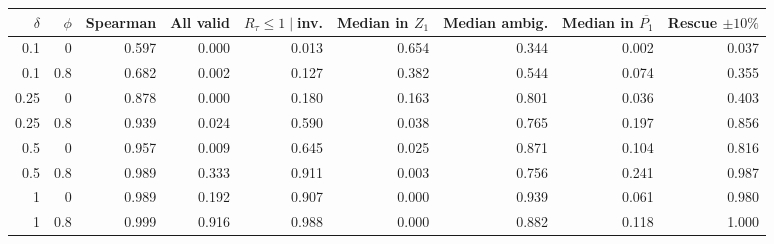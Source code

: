 \begin{tabular}{@{}rrrrrrrrr@{}}
\toprule
$\delta$ & $\phi$ & Spearman & All valid & $R_\tau\le1\mid$inv. & Median in $Z_1$ & Median ambig. & Median in $\overline{P_1}$ & Rescue $\pm10\%$\\
\midrule
0.1 & 0 & 0.597 & 0.000 & 0.013 & 0.654 & 0.344 & 0.002 & 0.037\\
0.1 & 0.8 & 0.682 & 0.002 & 0.127 & 0.382 & 0.544 & 0.074 & 0.355\\
0.25 & 0 & 0.878 & 0.000 & 0.180 & 0.163 & 0.801 & 0.036 & 0.403\\
0.25 & 0.8 & 0.939 & 0.024 & 0.590 & 0.038 & 0.765 & 0.197 & 0.856\\
0.5 & 0 & 0.957 & 0.009 & 0.645 & 0.025 & 0.871 & 0.104 & 0.816\\
0.5 & 0.8 & 0.989 & 0.333 & 0.911 & 0.003 & 0.756 & 0.241 & 0.987\\
1 & 0 & 0.989 & 0.192 & 0.907 & 0.000 & 0.939 & 0.061 & 0.980\\
1 & 0.8 & 0.999 & 0.916 & 0.988 & 0.000 & 0.882 & 0.118 & 1.000\\
\bottomrule
\end{tabular}
